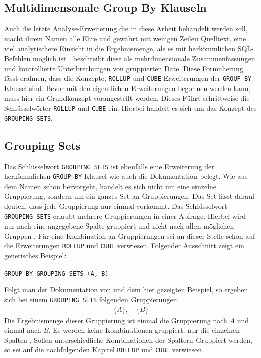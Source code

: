 \begin{samepage}
	\section{Multidimensonale Group By Klauseln}
	\label{sec:rollup_and_cube} Auch die letzte Analyse-Erweiterung die in diese Arbeit
	behandelt werden soll, macht ihrem Namen alle Ehre und gewährt mit wenigen
	Zeilen Quelltext, eine viel analytischere Einsicht in die Ergebnismenge, als
	es mit herkömmlichen SQL-Befehlen möglich ist \citep[vgl.][S. 303]{melton2002advanced}.
	\citet{melton2002advanced} beschreibt diese als mehrdimensionale Zusammenfassungen
	und kontrollierte Unterbrechungen von gruppierten Date. Diese Formulierung
	lässt erahnen, dass die Konzepte, \texttt{ROLLUP} und \texttt{CUBE}
	Erweiterungen der \texttt{GROUP BY} Klausel sind. Bevor mit den eigentlichen
	Erweiterungen begonnen werden kann, muss hier ein Grundkonzept vorangestellt werden.
	Dieses Führt schrittweise die Schlüsselwörter \texttt{ROLLUP} und \texttt{CUBE}
	ein. Hierbei handelt es sich um das Konzept des \texttt{GROUPING SETS}.

	\subsection{Grouping Sets}
	\label{subsec:grouping_sets} Das Schlüsselwort \texttt{GROUPING SETS} ist ebenfalls
	eine Erweiterung der herkömmlichen \texttt{GROUP BY} Klausel wie auch die
	\citet{oracle16} Dokumentation belegt. Wie aus dem Namen schon hervorgeht, handelt
	es sich nicht um eine einzelne Gruppierung, sondern um ein ganzes Set an
	Gruppierungen. Das Set lässt darauf deuten, dass jede Gruppierung nur einmal
	vorkommt. Das Schlüsselwort \texttt{GROUPING SETS} erlaubt mehrere
	Gruppierungen in einer Abfrage. Hierbei wird nur nach eine angegebene Spalte gruppiert
	und nicht nach allen möglichen Gruppen \citep[vgl.][]{oracle16}. Für eine Kombination
	an Gruppierungen sei an dieser Stelle schon auf die Erweiterungen \texttt{ROLLUP}
	und \texttt{CUBE} verwiesen. Folgender Ausschnitt zeigt ein generisches
	Beispiel:
	\begin{center}
		\texttt{GROUP BY GROUPING SETS (A, B)}
	\end{center}
	Folgt man der Dokumentation von \citet{oracle16} und dem hier gezeigten
	Beispiel, so ergeben sich bei einem \texttt{GROUPING SETS} folgenden
	Gruppierungen:
	\begin{align*}
		\{A\}, \quad \{B\}
	\end{align*}
	Die Ergebnismenge dieser Gruppierung ist einmal die Gruppierung nach $A$ und einmal
	nach $B$. Es werden keine Kombinationen gruppiert, nur die einzelnen Spalten \citep[vgl.][]{oracle16}.
	Sollen unterschiedliche Kombinationen der Spaltern Gruppiert werden, so sei
	auf die nachfolgenden Kapitel \texttt{ROLLUP} und \texttt{CUBE} verwiesen.
\end{samepage}

